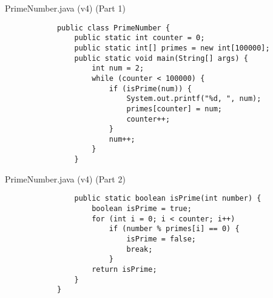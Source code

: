 \documentclass[10pt, compress]{beamer}
\begin{document}
\begin{slide}
	\begin{block}{PrimeNumber.java (v4) (Part 1)}
		\begin{verbatim}
			public class PrimeNumber {
			    public static int counter = 0;
			    public static int[] primes = new int[100000];
			    public static void main(String[] args) {
			        int num = 2;
			        while (counter < 100000) {
			            if (isPrime(num)) {
			                System.out.printf("%d, ", num);
			                primes[counter] = num;
			                counter++;
			            }
			            num++;
			        }
			    }
		\end{verbatim}
	\end{block}
\end{slide}

\begin{slide}
	\begin{block}{PrimeNumber.java (v4) (Part 2)}
		\begin{verbatim}
			    public static boolean isPrime(int number) {
			        boolean isPrime = true;
			        for (int i = 0; i < counter; i++)
			            if (number % primes[i] == 0) {
			                isPrime = false;
			                break;
			            }
			        return isPrime;
			    }
			}
		\end{verbatim}
	\end{block}
\end{slide}

\end{document}
